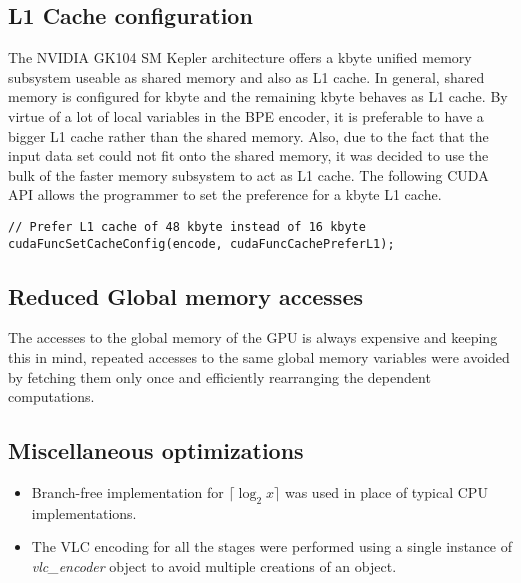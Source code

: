 \subsection{L1 Cache configuration}
The NVIDIA GK104 \gls{SM} Kepler architecture offers a \unit[64]{kbyte} unified memory subsystem useable as shared memory and also as L1 cache. In general, shared memory is configured for \unit[48]{kbyte} and the remaining \unit[16]{kbyte} behaves as L1 cache. By virtue of a lot of local variables in the \gls{BPE} encoder, it is preferable to have a bigger L1 cache rather than the shared memory. Also, due to the fact that the input data set could not fit onto the shared memory, it was decided to use the bulk of the faster memory subsystem to act as L1 cache. The following CUDA API allows the programmer to set the preference for a \unit[48]{kbyte} L1 cache.
\begin{verbatim}
// Prefer L1 cache of 48 kbyte instead of 16 kbyte
cudaFuncSetCacheConfig(encode, cudaFuncCachePreferL1);
\end{verbatim}

\subsection{Reduced Global memory accesses}
The accesses to the global memory of the GPU is always expensive and keeping this in mind, repeated accesses to the same global memory variables were avoided by fetching them only once and efficiently rearranging the dependent computations.

\subsection{Miscellaneous optimizations}
\begin{itemize}
  \item Branch-free implementation for $\lceil{\log_2 x}\rceil$ was used in place of typical CPU implementations.
  \item The \gls{VLC} encoding for all the stages were performed using a single instance of \textit{vlc\_encoder} object to avoid multiple creations of an object.
\end{itemize}

